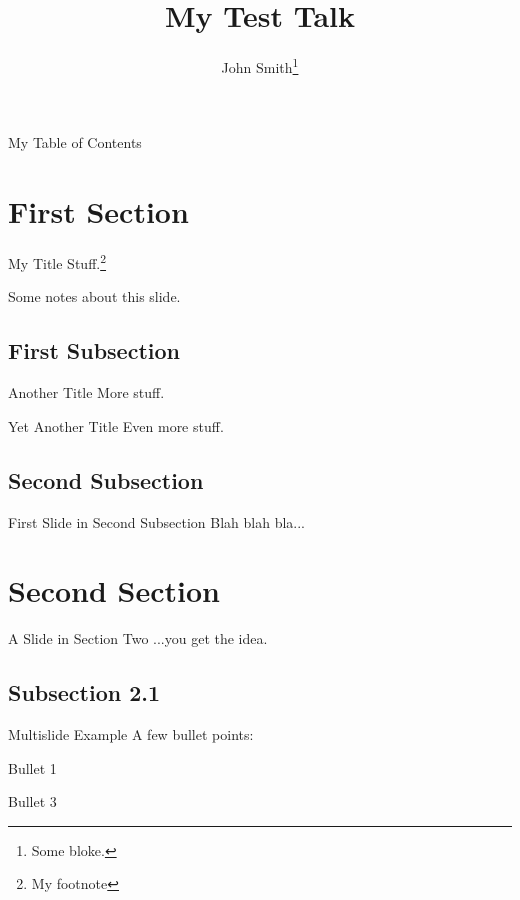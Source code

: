 \documentclass[12pt,screen]{talk}
\title{My Test Talk}
\author[John Smith]{John Smith\thanks{Some bloke.}}
\begin{document}
\begin{slide}[plain]{}
  \maketitle
\end{slide}
\begin{slide}[outline]{My Table of Contents}
  \tableofcontents
\end{slide}

\section{First Section}

\begin{slide}{My Title}
  Stuff.\footnote{My footnote}
\end{slide}
\begin{notes}
  Some notes about this slide.
\end{notes}

\subsection{First Subsection}
\begin{slide}{Another Title}
  More stuff.
\end{slide}
\begin{slide}{Yet Another Title}
  Even more stuff.
\end{slide}

\subsection{Second Subsection}
\begin{slide}{First Slide in Second Subsection}
  Blah blah bla...
\end{slide}

\section{Second Section}

\begin{slide}{A Slide in Section Two}
  ...you get the idea.
\end{slide}

\subsection{Subsection 2.1}
\begin{multislide}{3}{Multislide Example}
  A few bullet points:
  \begin{itemize}
  \item Bullet 1
  {\item Bullet 3}
  \end{itemize}
\end{multislide}
\end{document}

